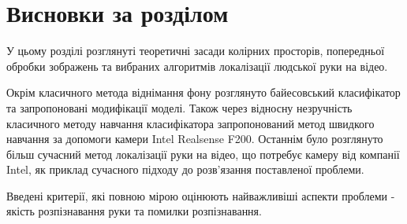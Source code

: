 \section{Висновки за розділом}

У цьому розділі розглянуті теоретичні засади колірних просторів, попередньої обробки зображень  та вибраних алгоритмів локалізації людської руки на відео.

Окрім класичного метода віднімання фону розглянуто байесовський класифікатор та запропоновані модифікації моделі. Також через відносну незручність класичного методу навчання класифікатора запропонований метод швидкого навчання за допомоги камери Intel Realsense F200. Останнім було розглянуто більш сучасний метод локалізації руки на відео, що потребує камеру від компанії Intel, як приклад сучасного підходу до розв'язання поставленої проблеми.

Введені критерії, які повною мірою оцінюють найважливіші аспекти проблеми - якість розпізнавання руки та помилки розпізнавання.